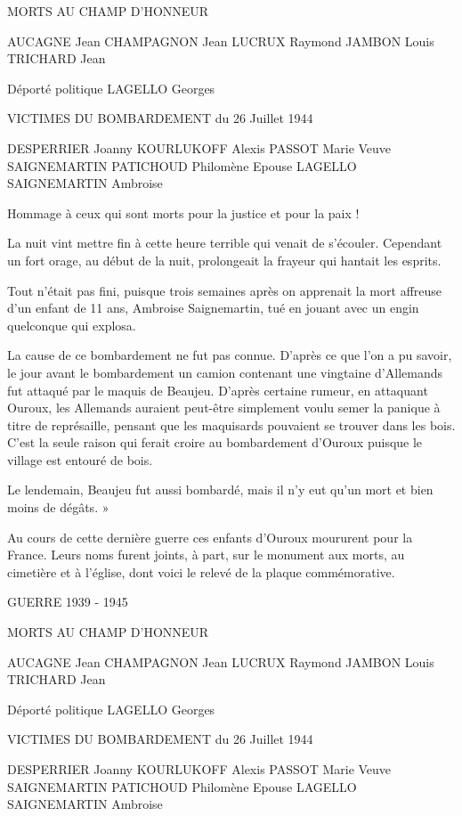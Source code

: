 MORTS AU CHAMP D'HONNEUR

AUCAGNE Jean  
CHAMPAGNON Jean  
LUCRUX Raymond  
JAMBON Louis  
TRICHARD Jean  

Déporté politique  
LAGELLO Georges  

VICTIMES DU BOMBARDEMENT  
du 26 Juillet 1944

DESPERRIER Joanny  
KOURLUKOFF Alexis  
PASSOT Marie  
Veuve SAIGNEMARTIN  
PATICHOUD Philomène  
Epouse LAGELLO  
SAIGNEMARTIN Ambroise  

Hommage à ceux qui sont morts pour la justice et pour la paix !
\fi

\iffalse
La nuit vint mettre fin à cette heure terrible qui venait de s'écouler. Cependant un fort orage, au début de la nuit, prolongeait la frayeur qui hantait les esprits.

Tout n'était pas fini, puisque trois semaines après on apprenait la mort affreuse d'un enfant de 11 ans, Ambroise Saignemartin, tué en jouant avec un engin quelconque qui explosa.

La cause de ce bombardement ne fut pas connue. D'après ce que l'on a pu savoir, le jour avant le bombardement un camion contenant une vingtaine d'Allemands fut attaqué par le maquis de Beaujeu. D'après certaine rumeur, en attaquant Ouroux, les Allemands auraient peut-être simplement voulu semer la panique à titre de représaille, pensant que les maquisards pouvaient se trouver dans les bois. C'est la seule raison qui ferait croire au bombardement d'Ouroux puisque le village est entouré de bois.

Le lendemain, Beaujeu fut aussi bombardé, mais il n'y eut qu'un mort et bien moins de dégâts. »

Au cours de cette dernière guerre ces enfants d'Ouroux moururent pour la France. Leurs noms furent joints, à part, sur le monument aux morts, au cimetière et à l'église, dont voici le relevé de la plaque commémorative.

GUERRE 1939 - 1945

MORTS AU CHAMP D'HONNEUR

AUCAGNE Jean  
CHAMPAGNON Jean  
LUCRUX Raymond  
JAMBON Louis  
TRICHARD Jean  

Déporté politique  
LAGELLO Georges  

VICTIMES DU BOMBARDEMENT  
du 26 Juillet 1944

DESPERRIER Joanny  
KOURLUKOFF Alexis  
PASSOT Marie  
Veuve SAIGNEMARTIN  
PATICHOUD Philomène  
Epouse LAGELLO  
SAIGNEMARTIN Ambroise  

